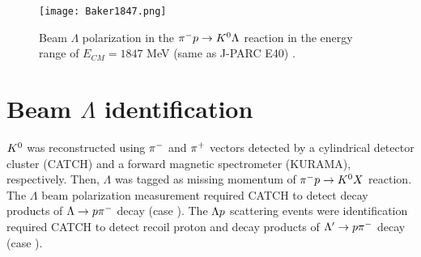 \documentclass[a4paper,11pt,twoside,twocolumn]{article}
\begin{document}

\begin{figure}[h]
  \centering
  \texttt{[image: Baker1847.png]}
  \caption{Beam $\Lambda$ polarization in the $\pi^- p \to K^0 \Lambda$ reaction in the energy range of $E_{CM}=1847$ MeV (same as J-PARC E40) \cite{Baker}.}
  \label{fig-Baker1847}
\end{figure}
\section{Beam $\Lambda$ identification}
\label{sec-LbeamID}

$K^{0}$ was reconstructed using $\pi^{-}$ and $\pi^{+}$ vectors detected by a cylindrical detector cluster (CATCH) and a forward magnetic spectrometer (KURAMA), respectively. Then, $\Lambda$ was tagged as missing momentum of $\pi^- p \to K^0 X$ reaction. The $\Lambda$ beam polarization measurement required CATCH to detect decay products of $\Lambda\to p\pi^{-}$ decay (case ). The $\Lambda p$ scattering events were identification required CATCH to detect recoil proton and decay products of $\Lambda'\to p\pi^{-}$ decay (case ).
\end{document}
